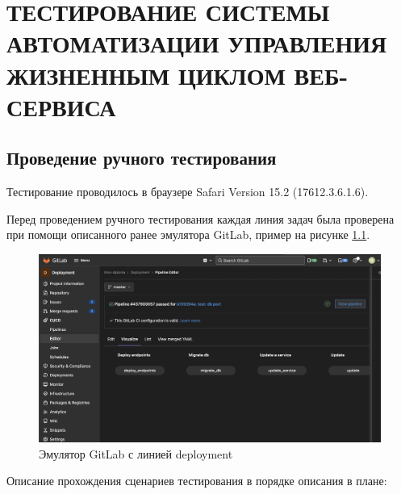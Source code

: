 \chapter{ТЕСТИРОВАНИЕ СИСТЕМЫ АВТОМАТИЗАЦИИ УПРАВЛЕНИЯ ЖИЗНЕННЫМ ЦИКЛОМ ВЕБ-СЕРВИСА}
\label{cha:research}

\section{Проведение ручного тестирования}

Тестирование проводилось в браузере Safari Version 15.2 (17612.3.6.1.6).

Перед проведением ручного тестирования каждая линия задач была проверена при помощи описанного ранее эмулятора GitLab, пример на рисунке \ref{fig:editor-example}.

\begin{figure}[ht]
    \centering
    \includegraphics[scale=0.3]{src/figures/editor-example}
    \caption{Эмулятор GitLab с линией deployment}
    \label{fig:editor-example}
\end{figure}

Описание прохождения сценариев тестирования в порядке описания в плане:

